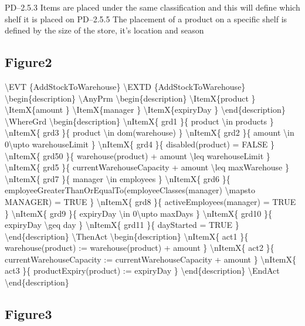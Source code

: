 PD--2.5.3 Items are placed under the same classification and this will define which shelf it is
placed on
PD--2.5.5 The placement of a product on a specific shelf is defined by the size of the store,
it’s location and season

\subsection{Figure2}
\label{figure2}

\textbackslash{}EVT \{AddStockToWarehouse\}
\textbackslash{}EXTD \{AddStockToWarehouse\}
\textbackslash{}begin\{description\}
\textbackslash{}AnyPrm
\textbackslash{}begin\{description\}
\textbackslash{}ItemX\{product \}
\textbackslash{}ItemX\{amount \}
\textbackslash{}ItemX\{manager \}
\textbackslash{}ItemX\{expiryDay \}
\textbackslash{}end\{description\}
\textbackslash{}WhereGrd
\textbackslash{}begin\{description\}
\textbackslash{}nItemX\{ grd1 \}\{ product \textbackslash{}in products \}
\textbackslash{}nItemX\{ grd3 \}\{ product \textbackslash{}in dom(warehouse) \}
\textbackslash{}nItemX\{ grd2 \}\{ amount \textbackslash{}in 0\textbackslash{}upto warehouseLimit \}
\textbackslash{}nItemX\{ grd4 \}\{ disabled(product) = FALSE \}
\textbackslash{}nItemX\{ grd50 \}\{ warehouse(product) + amount \textbackslash{}leq warehouseLimit \}
\textbackslash{}nItemX\{ grd5 \}\{ currentWarehouseCapacity + amount \textbackslash{}leq maxWarehouse \}
\textbackslash{}nItemX\{ grd7 \}\{ manager \textbackslash{}in employees \}
\textbackslash{}nItemX\{ grd6 \}\{ employeeGreaterThanOrEqualTo(employeeClasses(manager) \textbackslash{}mapsto MANAGER) = TRUE \}
\textbackslash{}nItemX\{ grd8 \}\{ activeEmployees(manager) = TRUE \}
\textbackslash{}nItemX\{ grd9 \}\{ expiryDay \textbackslash{}in 0\textbackslash{}upto maxDays \}
\textbackslash{}nItemX\{ grd10 \}\{ expiryDay \textbackslash{}geq day \}
\textbackslash{}nItemX\{ grd11 \}\{ dayStarted = TRUE \}
\textbackslash{}end\{description\}
\textbackslash{}ThenAct
\textbackslash{}begin\{description\}
\textbackslash{}nItemX\{ act1 \}\{ warehouse(product) := warehouse(product) + amount \}
\textbackslash{}nItemX\{ act2 \}\{ currentWarehouseCapacity := currentWarehouseCapacity + amount \}
\textbackslash{}nItemX\{ act3 \}\{ productExpiry(product) := expiryDay \}
\textbackslash{}end\{description\}
\textbackslash{}EndAct
\textbackslash{}end\{description\} 

\subsection{Figure3}
\label{figure3}


